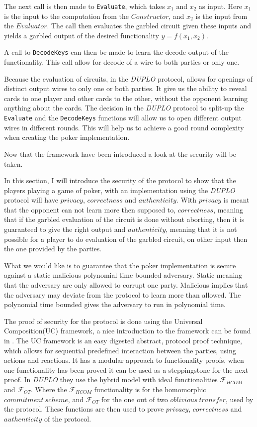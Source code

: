 \documentclass[twoside,11pt,openright]{report}
\newcommand{\DUPLO}{\textit{DUPLO} }
\begin{document}
The next call is then made to \verb|Evaluate|, which takes $x_1$ and $x_2$ as input. Here $x_1$ is the input to the computation from the $Constructor$, and $x_2$ is the input from the $Evaluator$. The call then  evaluates the garbled circuit given these inputs and yields a garbled output of the desired functionality $y=f(x_1,x_2)$.

A call to \verb|DecodeKeys| can then be made to learn the decode output of the functionality. This call allow for decode of a wire to both parties or only one.

\bigskip

Because the evaluation of circuits, in the \DUPLO protocol, allows for openings of distinct output wires to only one or both parties. It give us the ability to reveal cards to one player and other cards to the other, without the opponent learning anything about the cards. The decision in the \DUPLO protocol to split-up the \verb|Evaluate| and the \verb|DecodeKeys| functions will allow us to open different output wires in different rounds. This will help us to achieve a good round complexity when creating the poker implementation.

\bigskip

Now that the framework have been introduced a look at the security will be taken.

In this section, I will introduce the security of the protocol to show that the players playing a game of poker, with an implementation using the \DUPLO protocol will have $privacy$, $correctness$ and $authenticity$. With $privacy$ is meant that the opponent can not learn more then supposed to, $correctness$, meaning that if the garbled evaluation of the circuit is done without aborting, then it is guaranteed to give the right output and $authenticity$, meaning that it is not possible for a player to do evaluation of the garbled circuit, on other input then the one provided by the parties.

What we would like is to guarantee that the poker implementation is secure against a static malicious polynomial time bounded adversary. Static meaning that the adversary are only allowed to corrupt one party. Malicious implies that the adversary may deviate from the protocol to learn more than allowed. The polynomial time bounded gives the adversary to run in polynomial time.

\bigskip

The proof of security for the protocol is done using the Universal Composition(UC) framework, a nice introduction to the framework can be found in \cite{smcss}. The UC framework is an easy digested abstract, protocol proof technique, which allows for sequential predefined interaction between the parties, using actions and reactions. It has a modular approach to functionality proofs, when one functionality has been proved it can be used as a steppingstone for the next proof. In \DUPLO they use the hybrid model with ideal functionalities $\mathcal{F}_{HCOM}$ and $\mathcal{F}_{OT}$. Where the $\mathcal{F}_{HCOM}$ functionality is for the homomorphic $commitment~scheme$, and $\mathcal{F}_{OT}$ for the one out of two $oblivious~transfer$, used by the protocol. These functions are then used to prove $privacy$, $correctness$ and $authenticity$ of the protocol. 
\end{document}

